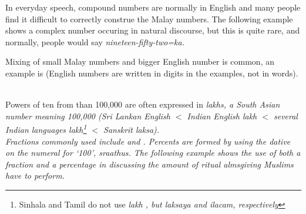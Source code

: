 %

 In everyday speech, compound numbers are normally in English and many people find it difficult to correctly construe the Malay numbers. The following example shows a complex number occuring in natural discourse, but this is quite rare, and normally, people would say \em nineteen-fifty-two=ka\em.


Mixing of small Malay numbers and bigger English number is common, an example is  (English numbers are written in digits in the examples, not in words).

 \\
Powers of ten from than 100,000 are often expressed in \em lakhs, a South Asian number meaning 100,000  \em (Sri Lankan English $<$ Indian English \em lakh \em $<$ several Indian languages \em lakh\footnote{Sinhala and Tamil do not use \em lakh \em, but \em lak\dotS saya \em and \em ila\tz cam\em, respectively} \em $<$ Sanskrit \em lak\dotS sa\em).
 \\




Fractions commonly used include  and .
Percents are formed by using the dative on the numeral for `100', \em sraathus\em. The following example shows the use of both a fraction and a percentage in discussing the amount of ritual almsgiving Muslims have to perform.



